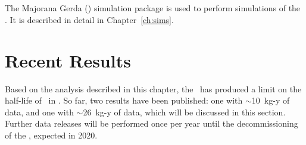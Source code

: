 \documentclass[/main.tex]{subfiles}
\begin{document}
\subsection{\Mage}
The Majorana Gerda (\Mage) simulation package is used to perform simulations of the \MJD\cite{mage2011}.
It is described in detail in Chapter~\ref{ch:sims}.

\section{Recent Results}
Based on the analysis described in this chapter, the \MJD\ has produced a limit on the half-life of \znbb\ in .
So far, two results have been published: one with ${\sim}$10~kg-y of data\cite{mjd2018}, and one with ${\sim}$26~kg-y of data\cite{mjd2019}, which will be discussed in this section.
Further data releases will be performed once per year until the decommissioning of the \MJD, expected in 2020.
\end{document}
